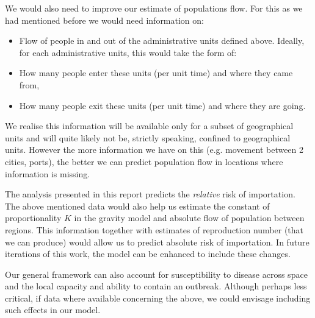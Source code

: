 \documentclass[11pt,]{article}
\begin{document}
We would also need to improve our estimate of populations flow.
For this as we had mentioned before we would need information on:

\begin{itemize}
 \item Flow of people in and out of the administrative units defined
   above.
   Ideally, for each administrative units, this would take the form of:
 \item How many people enter these units (per unit time) and where they came from,
 \item How many people exit these units (per unit time) and where they are going.
 \end{itemize}
 
We realise this information will be available only for a subset of
geographical units and will quite likely not be, strictly speaking,
confined to geographical units.
However the more information we have on this (e.g. movement between 2
cities, ports),
the better we can predict population flow in locations where
information is missing.

The analysis presented in this report predicts the \emph{relative} risk of
importation. The above mentioned data would also help us estimate the
constant of proportionality \(K\) in the gravity model and absolute
flow of population between regions. This
information together with estimates of reproduction number (that we can
produce) would allow us to predict absolute risk of importation. In
future iterations of this work, the model can be enhanced to include
these changes.

Our general framework can also account for susceptibility to
disease across space and the local capacity and ability to contain an outbreak.
Although perhaps less critical, if data where available concerning the
above, we could envisage including such effects in our model.


 
\end{document}
